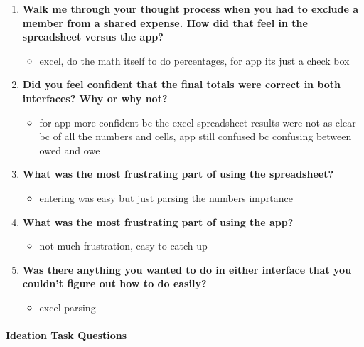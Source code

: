 \documentclass[12pt,a4paper]{article}
\begin{document}
\begin{enumerate}
    \item \textbf{Walk me through your thought process when you had to exclude a member from a shared expense. How did that feel in the spreadsheet versus the app?}
    
    \begin{itemize}
        \item excel, do the math itself to do percentages, for app its just a check box
    \end{itemize}
    
    \item \textbf{Did you feel confident that the final totals were correct in both interfaces? Why or why not?}
    
    \begin{itemize}
        \item for app more confident bc the excel spreadsheet results were not as clear bc of all the numbers and cells, app still confused bc confusing between owed and owe
    \end{itemize}
    
    \item \textbf{What was the most frustrating part of using the spreadsheet?}
    
    \begin{itemize}
        \item entering was easy but just parsing the numbers imprtance
    \end{itemize}
    
    \item \textbf{What was the most frustrating part of using the app?}
    
    \begin{itemize}
        \item not much frustration, easy to catch up
    \end{itemize}
    
    \item \textbf{Was there anything you wanted to do in either interface that you couldn't figure out how to do easily?}
    
    \begin{itemize}
        \item excel parsing
    \end{itemize}
\end{enumerate}

\paragraph{Ideation Task Questions}
\end{document}
